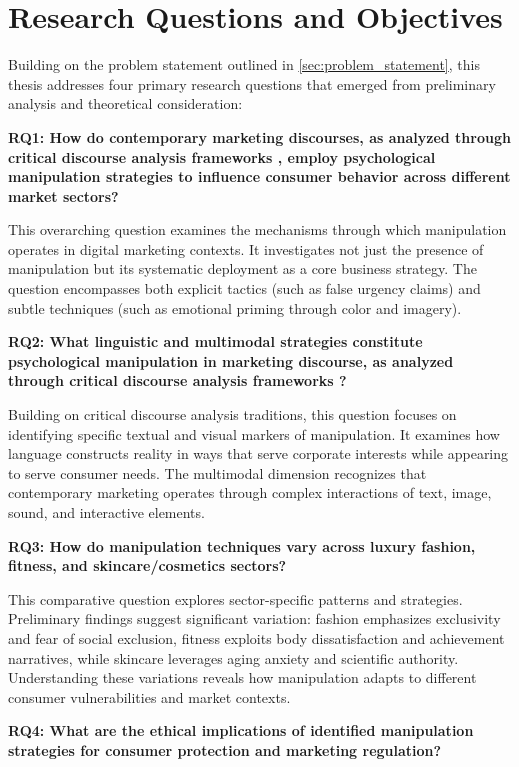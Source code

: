 \section{Research Questions and Objectives}
\label{sec:research_questions}

Building on the problem statement outlined in \autoref{sec:problem_statement}, this thesis addresses four primary research questions that emerged from preliminary analysis and theoretical consideration:

\textbf{RQ1: How do contemporary marketing discourses, as analyzed through critical discourse analysis frameworks \cite{fairclough2015language}, employ psychological manipulation strategies to influence consumer behavior across different market sectors?}

This overarching question examines the mechanisms through which manipulation operates in digital marketing contexts. It investigates not just the presence of manipulation but its systematic deployment as a core business strategy. The question encompasses both explicit tactics (such as false urgency claims) and subtle techniques (such as emotional priming through color and imagery).

\textbf{RQ2: What linguistic and multimodal strategies constitute psychological manipulation in marketing discourse, as analyzed through critical discourse analysis frameworks \cite{fairclough2015language}?}

Building on critical discourse analysis traditions, this question focuses on identifying specific textual and visual markers of manipulation. It examines how language constructs reality in ways that serve corporate interests while appearing to serve consumer needs. The multimodal dimension recognizes that contemporary marketing operates through complex interactions of text, image, sound, and interactive elements.

\textbf{RQ3: How do manipulation techniques vary across luxury fashion, fitness, and skincare/cosmetics sectors?}

This comparative question explores sector-specific patterns and strategies. Preliminary findings suggest significant variation: fashion emphasizes exclusivity and fear of social exclusion, fitness exploits body dissatisfaction and achievement narratives, while skincare leverages aging anxiety and scientific authority. Understanding these variations reveals how manipulation adapts to different consumer vulnerabilities and market contexts.

\textbf{RQ4: What are the ethical implications of identified manipulation strategies for consumer protection and marketing regulation?}

